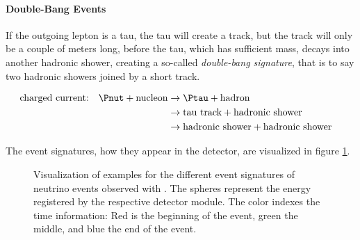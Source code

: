 \paragraph{Double-Bang Events}
If the outgoing lepton is a tau, the tau will create a track, but the track will only be a couple of meters long, before the tau, which has sufficient mass, decays into another hadronic shower, creating a so-called \textit{double-bang signature}, that is to say two hadronic showers joined by a short track. \cite{skysearch, energyreco, particledatareview}

\begin{align*}
  & \text{charged current:} & \Pnut + \text{nucleon}      & \rightarrow \Ptau + \text{hadron}                                   & \\
  &                         &                             & \rightarrow \text{tau track} + \text{hadronic shower}               & \\
  &                         &                             & \rightarrow \text{hadronic shower} + \text{hadronic shower}         & \\
\end{align*}

The event signatures, how they appear in the \icecube detector, are visualized in figure \ref{fig:eeQuaef6}.

\begin{figure}[htbp]
  \centering
  \hfill
  \hfill
  \hfill
  \caption{Visualization of examples for the different event signatures of neutrino events observed with \icecube. The spheres represent the energy registered by the respective detector module. The color indexes the time information: Red is the beginning of the event, green the middle, and blue the end of the event.}
  \label{fig:eeQuaef6}
\end{figure}


